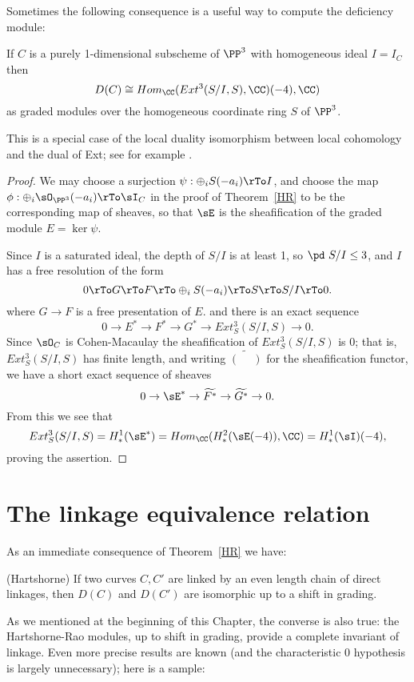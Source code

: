 Sometimes the following consequence is a useful way to compute the deficiency module:

\begin{corollary}\label{deficiency as dual of Ext}
If $C$ is a purely 1-dimensional subscheme of $\PP^3$ with homogeneous ideal $I = I_C$ then 
$$
D(C) \cong Hom_\CC (Ext^3(S/I, S), \CC)(-4), \CC)
$$
as graded modules over the homogeneous coordinate ring $S$ of $\PP^3$.
\end{corollary}

This is a special case of the local duality isomorphism between local cohomology and the dual of Ext; see for example \cite[Theorem A.1.9]{MR2103875}.
\begin{proof}
We may choose a surjection  $\psi:  \oplus_iS(-a_i)\rTo I$, and choose the map
$\phi: \oplus_i\sO_{\PP^3}(-a_i)\rTo\sI_C$
in the proof of Theorem~\ref{HR}
to be the corresponding map of sheaves, so that
$\sE$ is the sheafification of the graded module $E = \ker \psi$.

Since $I$ is a saturated ideal,
 the depth of $S/I$ is at least 1, so $\pd\ S/I\leq 3$, and $I$ has a free resolution of the form
$$
0\rTo G \rTo F \rTo \oplus_iS(-a_i)  \rTo S\rTo S/I \rTo 0.
$$
where $G\to F$ is a free presentation of $E$. and there is an exact sequence
$$
0 \to E^* \to F^* \to G^* \to Ext^3_S(S/I, S) \to 0.
$$
Since $\sO_C$ is Cohen-Macaulay the sheafification of $Ext^3_S(S/I, S)$ is 0; that is,
$Ext^3_S(S/I, S)$ has finite length, and writing $\widetilde{(\phantom{-})}$ for the sheafification functor,
we have a short exact sequence of sheaves 
$$
0\to \sE^* \to \widetilde{F^*} \to \widetilde{G^*}\to 0.
$$
From this we see that 
$$
Ext^3_S(S/I,S) = H^1_*(\sE^*) = Hom_\CC( H^2_*(\sE(-4)),\CC) = H^1_*(\sI)(-4),
$$
proving the assertion.
\end{proof}


\section{The linkage equivalence relation}
As an immediate consequence of Theorem~\ref{HR} we have:
\begin{corollary}(Hartshorne)
 If two curves $C,C'$ are linked by an even length chain of direct linkages, then 
 $D(C)$ and $D(C')$ are isomorphic up to a shift in grading.
\end{corollary}

As we mentioned at the beginning of this Chapter, the converse is also true: the Hartshorne-Rao modules, up to shift in grading, provide a complete invariant of
linkage. Even more precise results are known (and the characteristic 0 hypothesis is largely unnecessary); here is a sample:

